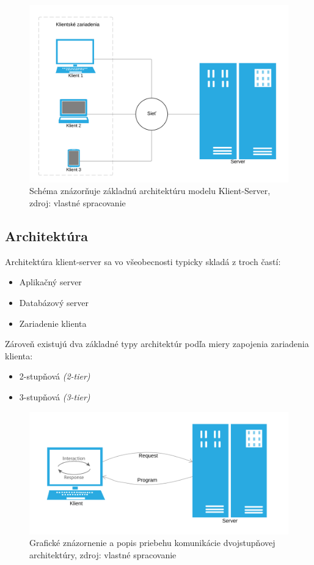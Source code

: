 \documentclass[
  digital, %
  table,   %
  lof,     %
  nolot,   %
  nocover
]{fithesis3}
\begin{document}
\begin{figure}[h]
  \centering
    \includegraphics[width=.94\textwidth]{images/C-S-basic.png}
  \caption{Schéma znázorňuje základnú architektúru modelu Klient-Server, zdroj:
  vlastné spracovanie}
  \label{fig:cs-basic}
\end{figure}

\subsection{Architektúra}
Architektúra klient-server sa vo všeobecnosti typicky skladá z troch 
častí:
\begin{itemize}
	\item Aplikačný server
	\item Databázový server
	\item Zariadenie klienta
\end{itemize}
Zároveň existujú dva základné typy architektúr podľa miery zapojenia zariadenia klienta: 
\begin{itemize}
	\item 2-stupňová \textit{(2-tier)}
	\item 3-stupňová \textit{(3-tier)}
\end{itemize}

\begin{figure}[t]
  \centering
    \includegraphics[width=.89\textwidth]{images/C-S-thick.png}
  \caption{Grafické znázornenie a popis priebehu komunikácie dvojstupňovej architektúry,
  zdroj: vlastné spracovanie}
  \label{fig:cs-thick}
\end{figure}
\end{document}
